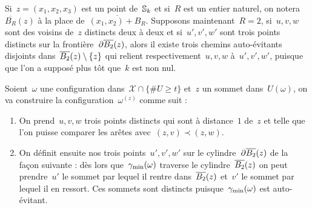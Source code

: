 			\begin{rem}
				Si~$z = (x_1, x_2, x_3)$ est un point de~$\mathbb{S}_k$ et si~$R$ est un entier naturel, on notera~$\overline{B_R}(z)$  à la place de~$\overline{(x_1, x_2) + B_R}$. Supposons maintenant~$R=2$, si~$u, v, w$ sont des voisins de~$z$ distincts deux à deux et si~$u', v', w'$ sont trois points distincts sur la frontière~$\partial \overline{B_{2}}(z)$, alors il existe trois chemins auto-évitants disjoints dans~$\overline{B_{2}}(z)\setminus\{z\}$ qui relient respectivement~$u, v, w$ à~$u', v', w'$, puisque que l'on a supposé plus tôt que~$k$ est non nul. 
			\end{rem}
			\begin{dem}
				Soient~$\omega$ une configuration dans~$\mathcal{X}\cap\{\# U \geq t\}$ et~$z$ un sommet dans~$U(\omega)$, on va construire la configuration~$\omega^{(z)}$  comme suit :
				\begin{enumerate}
					\item\label{item:cons:a} On prend~$u,v,w$  trois points distincts qui sont  à distance~$1$ de~$z$  et telle que l'on puisse comparer les arêtes avec~$(z,v)\prec (z,w)$.
					
					\item\label{item:cons:b} On définit ensuite nos trois points~$u',v',w'$ sur le cylindre~$\partial\overline{B_{2}}(z)$ de la façon suivante : dès lors que~$\gamma_{\mathrm{min}}(\omega)$ traverse le cylindre~$\overline{B_{2}}(z)$ on peut prendre~$u'$  le sommet par lequel il rentre dans~$\overline{B_{2}}(z)$ et~$v'$  le sommet par lequel il en ressort. Ces sommets sont distincts puisque~$\gamma_{\mathrm{min}}(\omega)$ est auto-évitant. 
					

\end{enumerate}
\end{dem}

